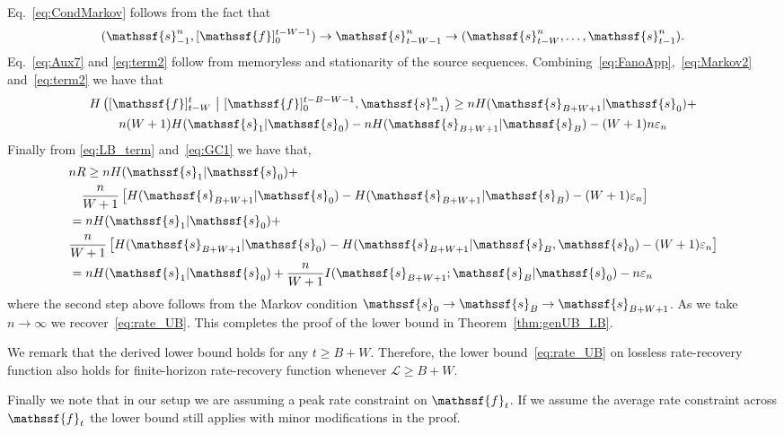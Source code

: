 \documentclass[journal, twocolumn, 10pt]{IEEEtran}
\newcommand{\eps}{\varepsilon}
\newcommand{\rvf}{{\mathssf{f}}}    %
\newcommand{\rvs}{{\mathssf{s}}}    %
\begin{document}
Eq.~\eqref{eq:CondMarkov}  follows from the fact that 
\begin{align}
(\rvs_{-1}^n,[\rvf]_0^{t-W-1})\rightarrow \rvs_{t-W-1}^n\rightarrow (\rvs_{t-W}^n, \ldots,\rvs_{t-1}^n).
\end{align} 
Eq.~\eqref{eq:Aux7} and \eqref{eq:term2} follow from memoryless and stationarity of the source sequences.
Combining~\eqref{eq:FanoApp},~\eqref{eq:Markov2} and~\eqref{eq:term2} we have that
\begin{multline}
H\left([\rvf]_{t-W}^{t}~\big|~[\rvf]_{0}^{t-B-W-1},\rvs_{-1}^n\right) 
 \ge n H(\rvs_{B+W+1} |\rvs_0) +  \\ n (W+1)H(\rvs_1 |\rvs_0)- n H(\rvs_{B+W+1} |\rvs_B)- (W+1)n\eps_n
\label{eq:LB_term}
\end{multline} Finally from \eqref{eq:LB_term} and~\eqref{eq:GC1} we have that,
\begin{align}
&nR \ge n H(\rvs_1 |\rvs_0) + \notag\\ 
&\quad\frac{n}{W+1} \left[H(\rvs_{B+W+1} |\rvs_0) -  H(\rvs_{B+W+1} |\rvs_B)- (W+1)\eps_n\right]\notag\\
&= n H(\rvs_1 |\rvs_0) + \notag\\ 
& \frac{n}{W+1} \left[H(\rvs_{B+W+1} |\rvs_0) -  H(\rvs_{B+W+1} |\rvs_B, \rvs_0)- (W+1)\eps_n\right]\notag\\
& =  n H(\rvs_1 |\rvs_0) + \frac{n}{W+1} I(\rvs_{B+W+1} ; \rvs_{B} |\rvs_0)- n\eps_n  \label{eq:LB_bound}
\end{align} %
where the second step above follows from the Markov condition $\rvs_0 \rightarrow \rvs_B \rightarrow \rvs_{B+W+1}$.
As we take $n\rightarrow \infty$ we recover~\eqref{eq:rate_UB}.
This completes the proof of the lower bound in Theorem~\ref{thm:genUB_LB}.

We remark that the derived lower bound holds for any $t\ge B+W$. Therefore, the lower bound~\eqref{eq:rate_UB} on lossless rate-recovery function also holds for finite-horizon rate-recovery function whenever $\mathcal{L} \ge B+W$.

Finally we note that in our setup we are assuming a peak rate constraint on $\rvf_t$. If we assume the average rate constraint across $\rvf_t$ the lower bound still applies with minor modifications in the proof. 
\end{document}
